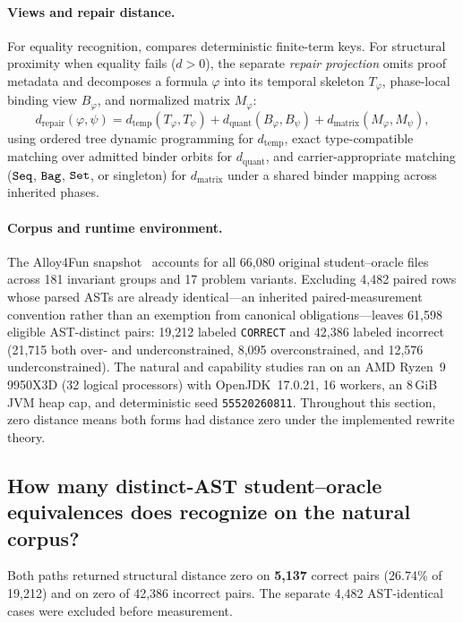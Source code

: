 \paragraph{Views and repair distance.}
For equality recognition, \CanDis{} compares deterministic finite-term keys.
For structural proximity when equality fails ($d>0$), the separate
\emph{repair projection} omits proof metadata and decomposes a formula $\varphi$
into its temporal skeleton $T_\varphi$, phase-local binding view $B_\varphi$,
and normalized matrix $M_\varphi$:
\[
 d_{\mathrm{repair}}(\varphi,\psi)=
 d_{\mathrm{temp}}(T_\varphi,T_\psi)+
 d_{\mathrm{quant}}(B_\varphi,B_\psi)+
 d_{\mathrm{matrix}}(M_\varphi,M_\psi),
\]
using ordered tree dynamic programming for $d_{\mathrm{temp}}$, exact
type-compatible matching over admitted binder orbits for $d_{\mathrm{quant}}$,
and carrier-appropriate matching ($\texttt{Seq}$, $\texttt{Bag}$, $\texttt{Set}$, or singleton) for
$d_{\mathrm{matrix}}$ under a shared binder mapping across inherited phases.

\paragraph{Corpus and runtime environment.}
The Alloy4Fun snapshot~\cite{alloy4funDataset2023,alloy4fun,novice} accounts
for all 66,080 original student--oracle files across 181 invariant groups and
17 problem variants. Excluding 4,482 paired rows whose parsed ASTs are already
identical—an inherited paired-measurement convention rather than an exemption
from canonical obligations—leaves 61,598 eligible AST-distinct pairs: 19,212
labeled \texttt{CORRECT} and 42,386 labeled incorrect (21,715 both over- and
underconstrained, 8,095 overconstrained, and 12,576 underconstrained). The
natural and capability studies ran on an AMD Ryzen~9 9950X3D (32 logical
processors) with OpenJDK~17.0.21, 16 workers, an 8\,GiB JVM heap cap, and
deterministic seed \texttt{55520260811}. Throughout this section, zero distance
means both forms had distance zero under the implemented rewrite theory.

\subsection{How many distinct-AST student--oracle equivalences does \CanDis{} recognize on the natural corpus?}
\label{sec:eval-paired}

Both paths returned structural distance zero on \textbf{5,137} correct
pairs (26.74\% of 19,212) and on zero of 42,386 incorrect pairs.
The separate 4,482 AST-identical cases were excluded before measurement.

